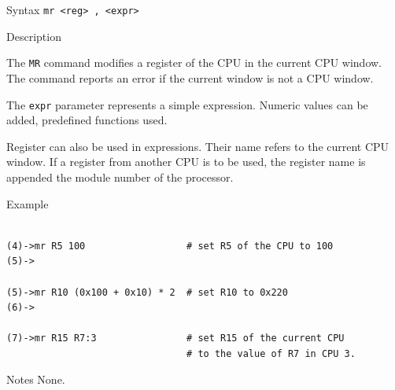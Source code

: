 %
%
\pagebreak
{}

\begin{iPageDescEntry}{Syntax}
\texttt{mr <reg> , <expr> } \\
\end{iPageDescEntry}

\begin{iPageDescEntry}{Description}

The \texttt{MR} command modifies a register of the CPU in the current CPU window. The command reports an error if the current window is not a CPU window.

The \texttt{expr} parameter represents a simple expression. Numeric values can be added, predefined functions used.

Register can also be used in expressions. Their name refers to the current CPU window. If a register from another CPU is to be used, the register name is appended the module number of the processor. 

\end{iPageDescEntry}

\begin{iPageDescOpEntry}{Example}
\begin{lstlisting}[style=iPageOpStyle]

(4)->mr R5 100                  # set R5 of the CPU to 100
(5)->

(5)->mr R10 (0x100 + 0x10) * 2  # set R10 to 0x220
(6)->

(7)->mr R15 R7:3                # set R15 of the current CPU
                                # to the value of R7 in CPU 3.

\end{lstlisting}
\end{iPageDescOpEntry}

\begin{iPageDescEntry}{Notes}
None.
\end{iPageDescEntry}
